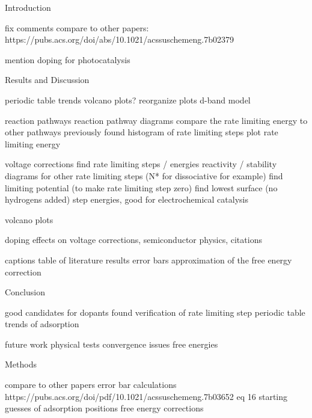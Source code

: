 Introduction

fix comments
compare to other papers: https://pubs.acs.org/doi/abs/10.1021/acssuschemeng.7b02379

mention doping for photocatalysis

Results and Discussion

periodic table trends
volcano plots?
reorganize plots
d-band model

reaction pathways
reaction pathway diagrams
compare the rate limiting energy to other pathways previously found
histogram of rate limiting steps
plot rate limiting energy

voltage corrections
find rate limiting steps / energies
reactivity / stability diagrams for other rate limiting steps (N* for dissociative for example)
find limiting potential (to make rate limiting step zero)
find lowest surface (no hydrogens added) step energies, good for electrochemical catalysis

volcano plots

doping effects on voltage corrections, semiconductor physics, citations


captions
table of literature results
error bars
approximation of the free energy correction


Conclusion

good candidates for dopants found
verification of rate limiting step
periodic table trends of adsorption

future work
physical tests
convergence issues
free energies

Methods

compare to other papers
error bar calculations
https://pubs.acs.org/doi/pdf/10.1021/acssuschemeng.7b03652 eq 16
starting guesses of adsorption positions
free energy corrections
